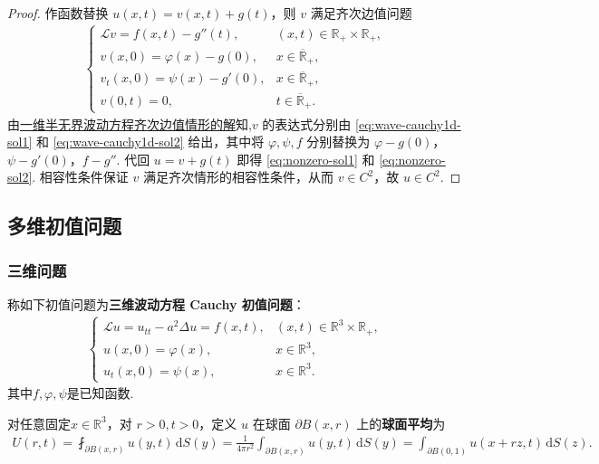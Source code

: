 \documentclass[../../main.tex]{subfiles}%
\begin{document}
\begin{proof}
作函数替换 $u(x,t)=v(x,t)+g(t)$，则 $v$ 满足齐次边值问题
\begin{align*}
\begin{cases}
\mathcal{L}v=f(x,t)-g''(t), & (x,t)\in\mathbb{R}_+\times\mathbb{R}_+, \\
v(x,0)=\varphi(x)-g(0), & x\in\overline{\mathbb{R}}_+, \\
v_t(x,0)=\psi(x)-g'(0), & x\in\overline{\mathbb{R}}_+, \\
v(0,t)=0, & t\in\overline{\mathbb{R}}_+.
\end{cases}
\end{align*}
由\hyperref[theroem:一维半无界波动方程齐次边值情形的解]{一维半无界波动方程齐次边值情形的解}知,$v$ 的表达式分别由 \eqref{eq:wave-cauchy1d-sol1} 和 \eqref{eq:wave-cauchy1d-sol2} 给出，其中将 $\varphi,\psi,f$ 分别替换为 $\varphi-g(0)$，$\psi-g'(0)$，$f-g''$. 代回 $u=v+g(t)$ 即得 \eqref{eq:nonzero-sol1} 和 \eqref{eq:nonzero-sol2}. 相容性条件保证 $v$ 满足齐次情形的相容性条件，从而 $v\in C^2$，故 $u\in C^2$.
\end{proof}


\subsection{多维初值问题}

\subsubsection{三维问题}

\begin{definition}
称如下初值问题为\textbf{三维波动方程 Cauchy 初值问题}：
\begin{align}
\begin{cases}
\mathcal{L}u=u_{tt}-a^2\Delta u=f(x,t), & (x,t)\in\mathbb{R}^3\times\mathbb{R}_+, \\
u(x,0)=\varphi(x), & x\in\mathbb{R}^3, \\
u_t(x,0)=\psi(x), & x\in\mathbb{R}^3.
\end{cases} \label{eq:wave-cauchy3d}
\end{align}
其中$f,\varphi,\psi$是已知函数.
\end{definition}

\begin{definition}
对任意固定$x\in\mathbb{R}^3$，对 $r>0,t>0$，定义 $u$ 在球面 $\partial B(x,r)$ 上的\textbf{球面平均}为
\begin{align}
U(r,t)=\fint_{\partial B(x,r)}u(y,t)\,\mathrm{d}S(y)
=\frac{1}{4\pi r^2}\int_{\partial B(x,r)}u(y,t)\,\mathrm{d}S(y)
=\int_{\partial B(0,1)}u(x+rz,t)\,\mathrm{d}S(z). \label{eq:spherical-avg}
\end{align}
\end{definition}
\end{document}
